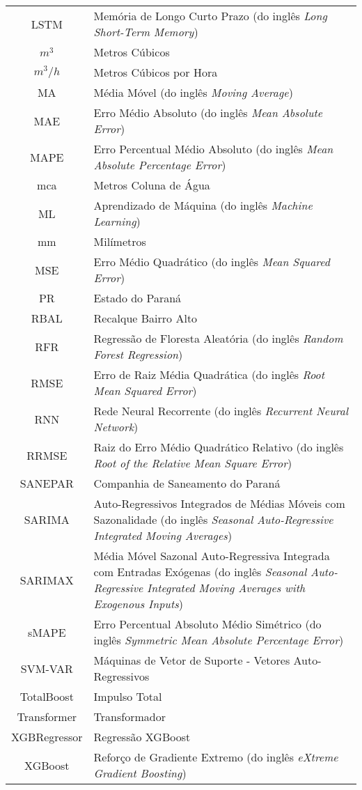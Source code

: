 \begin{tabular}{cp{}}
	LSTM & Memória de Longo Curto Prazo (do inglês \textit{Long Short-Term Memory})	\\
	$m^3$ & Metros Cúbicos\\
	$m^3/h$ & Metros Cúbicos por Hora\\
	MA & Média Móvel (do inglês \textit{Moving Average})\\
	MAE & Erro Médio Absoluto (do inglês \textit{Mean Absolute Error})\\
	MAPE & Erro Percentual Médio Absoluto (do inglês \textit{Mean Absolute Percentage Error})\\
	mca & Metros Coluna de Água\\
	ML & Aprendizado de Máquina (do inglês \textit{Machine Learning})\\
	mm & Milímetros\\
	MSE & Erro Médio Quadrático (do inglês \textit{Mean Squared Error})\\
	PR & Estado do Paraná\\
	RBAL & Recalque Bairro Alto\\
	RFR & Regressão de Floresta Aleatória (do inglês \textit{Random Forest Regression})\\
	RMSE & Erro de Raiz Média Quadrática (do inglês \textit{Root Mean Squared Error})\\
	RNN & Rede Neural Recorrente (do inglês \textit{Recurrent Neural Network})\\
	RRMSE & Raiz do Erro Médio Quadrático Relativo (do inglês \textit{Root of the Relative Mean Square Error})\\
	SANEPAR & Companhia de Saneamento do Paraná \\
	SARIMA & Auto-Regressivos Integrados de Médias Móveis com Sazonalidade (do inglês \textit{Seasonal Auto-Regressive Integrated Moving Averages}) \\
	SARIMAX & Média Móvel Sazonal Auto-Regressiva Integrada com Entradas Exógenas (do inglês \textit{Seasonal Auto-Regressive Integrated Moving Averages with Exogenous Inputs}) \\
	sMAPE &  Erro Percentual Absoluto Médio Simétrico (do inglês \textit{Symmetric Mean Absolute Percentage Error})\\
	SVM-VAR & Máquinas de Vetor de Suporte - Vetores Auto-Regressivos\\
	TotalBoost & Impulso Total\\
	Transformer & Transformador \\
	XGBRegressor & Regressão XGBoost\\
	XGBoost & Reforço de Gradiente Extremo (do inglês \textit{eXtreme Gradient Boosting})
\end{tabular}
